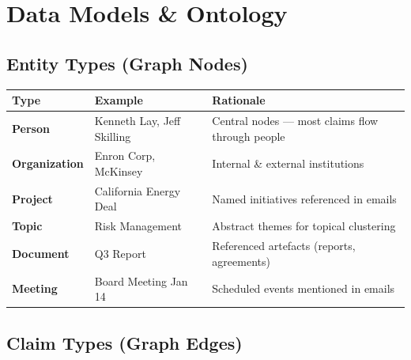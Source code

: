 \documentclass[11pt,a4paper]{article}
\begin{document}
\section{Data Models \& Ontology}

\subsection{Entity Types (Graph Nodes)}

\begin{table}[H]
\centering\small
\begin{tabularx}{\linewidth}{L{2.6cm} L{3.2cm} X}
\toprule
{}
\color{white}\textbf{Type} & \color{white}\textbf{Example} & \color{white}\textbf{Rationale} \\
\midrule
\textbf{Person}       & Kenneth Lay, Jeff Skilling & Central nodes — most claims flow through people \\
\textbf{Organization} & Enron Corp, McKinsey & Internal \& external institutions \\
\textbf{Project}      & California Energy Deal & Named initiatives referenced in emails \\
\textbf{Topic}        & Risk Management & Abstract themes for topical clustering \\
\textbf{Document}     & Q3 Report & Referenced artefacts (reports, agreements) \\
\textbf{Meeting}      & Board Meeting Jan 14 & Scheduled events mentioned in emails \\
\bottomrule
\end{tabularx}
\end{table}

\subsection{Claim Types (Graph Edges)}
\end{document}
